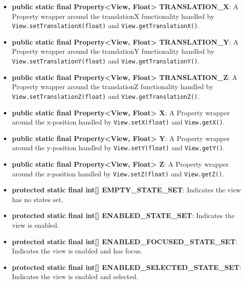 \documentclass{report}
\begin{document}
\begin{itemize}
\begin{itemize}
                \item \textbf{public static final Property<View, Float> TRANSLATION\_X}:  
                    A Property wrapper around the translationX functionality handled by \texttt{View.setTranslationX(float)} and \texttt{View.getTranslationX()}.

                \item \textbf{public static final Property<View, Float> TRANSLATION\_Y}:  
                    A Property wrapper around the translationY functionality handled by \texttt{View.setTranslationY(float)} and \texttt{View.getTranslationY()}.

                \item \textbf{public static final Property<View, Float> TRANSLATION\_Z}:  
                    A Property wrapper around the translationZ functionality handled by \texttt{View.setTranslationZ(float)} and \texttt{View.getTranslationZ()}.

                \item \textbf{public static final Property<View, Float> X}:  
                    A Property wrapper around the x-position handled by \texttt{View.setX(float)} and \texttt{View.getX()}.

                \item \textbf{public static final Property<View, Float> Y}:  
                    A Property wrapper around the y-position handled by \texttt{View.setY(float)} and \texttt{View.getY()}.

                \item \textbf{public static final Property<View, Float> Z}:  
                    A Property wrapper around the z-position handled by \texttt{View.setZ(float)} and \texttt{View.getZ()}.

                \item \textbf{protected static final int[] EMPTY\_STATE\_SET}:  
                    Indicates the view has no states set.

                \item \textbf{protected static final int[] ENABLED\_STATE\_SET}:  
                    Indicates the view is enabled.

                \item \textbf{protected static final int[] ENABLED\_FOCUSED\_STATE\_SET}:  
                    Indicates the view is enabled and has focus.

                \item \textbf{protected static final int[] ENABLED\_SELECTED\_STATE\_SET}:  
                    Indicates the view is enabled and selected.


\end{itemize}
\end{itemize}
\end{document}
